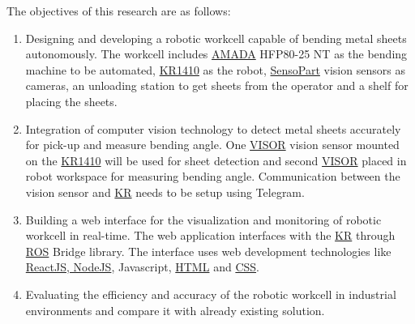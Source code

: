 The objectives of this research are as follows:
\begin{enumerate}
    \item Designing and developing a robotic workcell capable of bending metal sheets autonomously. The workcell includes \hyperref[acro:AMADA]{AMADA} HFP80-25 NT as the bending machine to be automated, \hyperref[acro:KR]{KR1410} as the robot, \hyperref[acro:SensoPart]{SensoPart} vision sensors as cameras, an unloading station to get sheets from the operator and a shelf for placing the sheets.
    \item Integration of computer vision technology to detect metal sheets accurately for pick-up and measure bending angle. One \hyperref[acro:VISOR]{VISOR\textsuperscript{\textregistered}} vision sensor mounted on the \hyperref[acro:KR]{KR1410} will be used for sheet detection and second \hyperref[acro:VISOR]{VISOR\textsuperscript{\textregistered}} placed in robot workspace for measuring bending angle. Communication between the vision sensor and \hyperref[acro:KR]{KR} needs to be setup using Telegram.
    \item Building a web interface for the visualization and monitoring of robotic workcell in real-time. The web application interfaces with the \hyperref[acro:KR]{KR} through \hyperref[acro:ROS]{ROS} Bridge library. The interface uses web development technologies like \hyperref[acro:JS]{ReactJS, NodeJS}, Javascript, \hyperref[acro:HTML5]{HTML} and \hyperref[acro:CSS]{CSS}.
    \item Evaluating the efficiency and accuracy of the robotic workcell in industrial environments and compare it with already existing solution.
\end{enumerate}